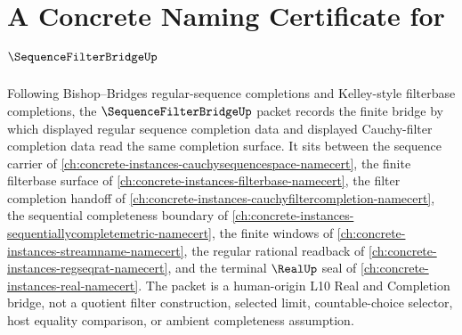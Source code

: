 \chapter{A Concrete Naming Certificate for $\SequenceFilterBridgeUp$}
\label{ch:concrete-instances-sequence-filter-bridge-namecert}

Following Bishop--Bridges regular-sequence completions and Kelley-style filterbase completions, the $\SequenceFilterBridgeUp$ packet records the finite bridge by which displayed regular sequence completion data and displayed Cauchy-filter completion data read the same completion surface. It sits between the sequence carrier of \autoref{ch:concrete-instances-cauchysequencespace-namecert}, the finite filterbase surface of \autoref{ch:concrete-instances-filterbase-namecert}, the filter completion handoff of \autoref{ch:concrete-instances-cauchyfiltercompletion-namecert}, the sequential completeness boundary of \autoref{ch:concrete-instances-sequentiallycompletemetric-namecert}, the finite windows of \autoref{ch:concrete-instances-streamname-namecert}, the regular rational readback of \autoref{ch:concrete-instances-regseqrat-namecert}, and the terminal $\RealUp$ seal of \autoref{ch:concrete-instances-real-namecert}. The packet is a human-origin L10 Real and Completion bridge, not a quotient filter construction, selected limit, countable-choice selector, host equality comparison, or ambient completeness assumption.

